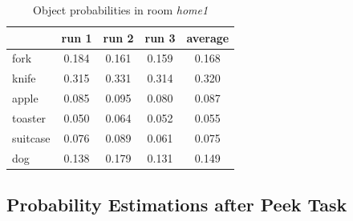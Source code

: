 \begin{table}[h]
\centering
\begin{tabular}{|l|c|c|c|c|}
\hline
 & run 1 & run 2 & run 3 & average\\ \hline
fork & 0.184 & 0.161 & 0.159 & 0.168\\ \hline
knife & 0.315 & 0.331 & 0.314 & 0.320\\ \hline
apple & 0.085 & 0.095 & 0.080 & 0.087\\ \hline
toaster & 0.050 & 0.064 & 0.052 & 0.055\\ \hline
suitcase & 0.076 & 0.089 & 0.061 & 0.075\\ \hline
dog & 0.138 & 0.179 & 0.131 & 0.149\\ \hline
\end{tabular}
\caption{Object probabilities in room \textit{home1}}
\label{totalobj}
\end{table}

\subsection{Probability Estimations after Peek Task}

